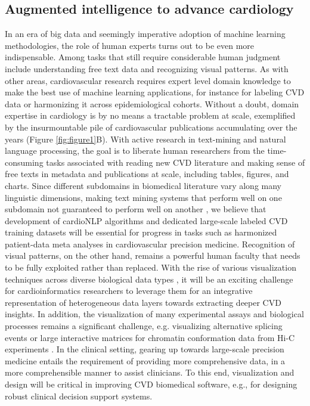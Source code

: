 \documentclass[letter]{bioinfo}
\begin{document}
	
	\subsection*{Augmented intelligence to advance cardiology}
	In an era of big data and seemingly imperative adoption of machine learning methodologies, the role of human experts turns out to be even more indispensable. Among tasks that still require considerable human judgment include understanding free text data and recognizing visual patterns.  As with other areas, cardiovascular research requires expert level domain knowledge to make the best use of machine learning applications, for instance for labeling CVD data or harmonizing it across epidemiological cohorts.  Without a doubt, domain expertise in cardiology is by no means a tractable problem at scale, exemplified by the insurmountable pile of cardiovascular publications accumulating over the years (Figure \ref{fig:figure1}B).  With active research in text-mining and natural language processing, the goal is to liberate human researchers from the time-consuming tasks associated with reading new CVD literature and making sense of free texts in metadata and publications at scale, including tables, figures, and charts. Since different subdomains in biomedical literature vary along many linguistic dimensions, making text mining systems that perform well on one subdomain not guaranteed to perform well on another \citep{Lippincott:2011:Exploring, Kilicoglu:2018:Biomedical, Khomtchouk:2018:Biochat}, we believe that development of cardioNLP algorithms and dedicated large-scale labeled CVD training datasets will be essential for progress in tasks such as harmonized patient-data meta analyses in cardiovascular precision medicine.
	Recognition of visual patterns, on the other hand, remains a powerful human faculty that needs to be fully exploited rather than replaced. With the rise of various visualization techniques across diverse biological data types \citep{Pavlopoulos:2015:Visualizing}, it will be an exciting challenge for cardioinformatics researchers to leverage them for an integrative representation of heterogeneous data layers towards extracting deeper CVD insights. In addition, the visualization of many experimental assays and biological processes remains a significant challenge, e.g. visualizing alternative splicing events \citep{Katz:2015:Quantitative,Strobelt:2016:Vials} or large interactive matrices for chromatin conformation data from Hi-C experiments \citep{Kerpedjiev:2018:HiGlass,Lekschas:2018:HiPiler}. In the clinical setting, gearing up towards large-scale precision medicine entails the requirement of providing more comprehensive data, in a more comprehensible manner to assist clinicians. To this end, visualization and design will be critical in improving CVD biomedical software, e.g., for designing robust clinical decision support systems.
\end{document}
